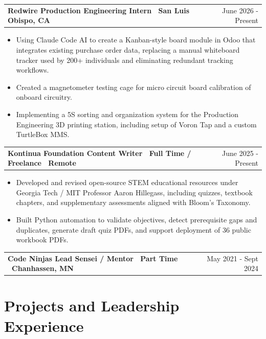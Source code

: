 \documentclass[a4paper,12pt]{article}
\makeatletter
\newenvironment{jobshort}[2]
    {
    \begin{tabularx}{\linewidth}{@{}l X r@{}}
    \textbf{#1} & \hfill &  #2 \\[3.75pt]
    \end{tabularx}
    }
    {
    }
\newenvironment{joblong}[2]
    {
    \begin{tabularx}{\linewidth}{@{}l X r@{}}
    \textbf{#1} & \hfill &  #2 \\[3.75pt]
    \end{tabularx}
    \begin{minipage}[t]{\linewidth}
    \begin{itemize}[nosep,after=\strut, leftmargin=1em, itemsep=3pt,label=\small$\bullet$]
    }
    {
    \end{itemize}
    \end{minipage}    
    }
\makeatother
\begin{document}

\begin{joblong}{Redwire Production Engineering Intern \textbullet\ San Luis Obispo, CA}{June 2026 - Present}
\item Using Claude Code AI to create a Kanban-style board module in Odoo that integrates existing purchase order data, replacing a manual whiteboard tracker used by 200+ individuals and eliminating redundant tracking workflows.
\item Created a magnetometer testing cage for micro circuit board calibration of onboard circuitry.
\item Implementing a 5S sorting and organization system for the Production Engineering 3D printing station, including setup of Voron Tap and a custom TurtleBox MMS.
\end{joblong}

\begin{joblong}{Kontinua Foundation Content Writer \textbullet\ Full Time / Freelance \textbullet\ Remote}{June 2025 - Present}
\item Developed and revised open-source STEM educational resources under Georgia Tech / MIT Professor Aaron Hillegass, including quizzes, textbook chapters, and supplementary assessments aligned with Bloom's Taxonomy.
\item Built Python automation to validate objectives, detect prerequisite gaps and duplicates, generate draft quiz PDFs, and support deployment of 36 public workbook PDFs.
\end{joblong}

\begin{jobshort}{Code Ninjas Lead Sensei / Mentor \textbullet\ Part Time \textbullet\ Chanhassen, MN}{May 2021 - Sept 2024}
\end{jobshort}
\section{Projects and Leadership Experience}
\end{document}
